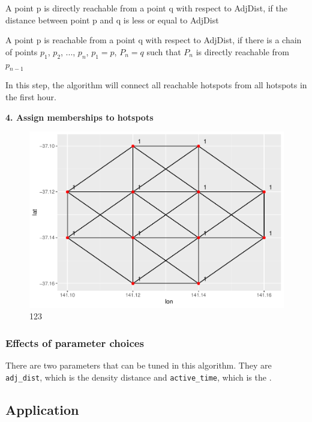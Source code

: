 \begin{defn} A point p is directly reachable from a point q with respect to AdjDist, if the distance between point p and q is less or equal to AdjDist\end{defn}

\begin{defn}[reachable] A point p is reachable from a point q with respect to AdjDist, if there is a chain of points $p_1$, $p_2$, ..., $p_n$, $p_1 = p$, $P_n = q$ such that $P_n$ is directly reachable from $p_{n-1}$ \end{defn}

In this step, the algorithm will connect all reachable hotspots from all
hotspots in the first hour.

\textbf{4. Assign memberships to hotspots}

\begin{Schunk}
\begin{figure}
\includegraphics[width=0.8\linewidth]{clustering_paper_files/figure-latex/step4-1} \caption[123]{123}\label{fig:step4}
\end{figure}
\end{Schunk}

\hypertarget{effects-of-parameter-choices}{%
\subsubsection{Effects of parameter
choices}\label{effects-of-parameter-choices}}

There are two parameters that can be tuned in this algorithm. They are
\texttt{adj\_dist}, which is the density distance and
\texttt{active\_time}, which is the .

\hypertarget{application}{%
\subsection{Application}\label{application}}

